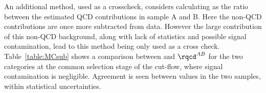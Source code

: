 
An additional method, used as a crosscheck, considers calculating \rqcd as the ratio between the estimated QCD contributions in sample A 
and B. Here the non-QCD contributions are once more subtracted from data. However the large contribution of this non-QCD background, 
along with lack of statistics and possible signal contamination, lead to this method being only used as a cross check. Table~\ref{table:MCsub} shows 
a comparison between \rqcd and $\rqcd^{AB}$ for the two categories at the common selection stage of the cut-flow, where signal contamination is negligible. 
Agreement is seen between \rqcd values in the two samples, within statistical uncertainties. 


